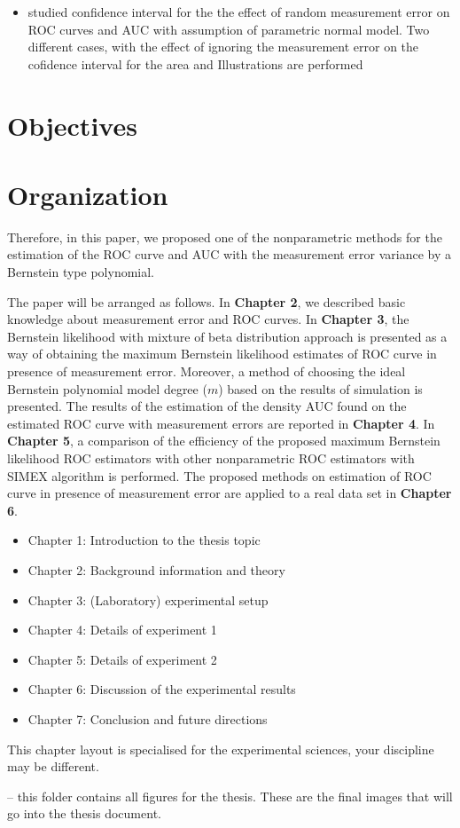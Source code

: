 \begin{itemize}
  \item \cite{faraggi2000effect} studied confidence interval for the the effect of random measurement error on ROC curves and AUC with assumption of parametric normal model. Two different cases, with the effect of ignoring the measurement error on the cofidence interval for the area and  Illustrations are performed
\end{itemize}



\section{Objectives}

\section{Organization}

Therefore, in this paper, we proposed one of the nonparametric methods for the estimation of the ROC curve and AUC with the measurement error variance by a Bernstein type polynomial.

The paper will be arranged as follows. In \textbf{Chapter 2}, we described basic knowledge about measurement error and ROC curves. In \textbf{Chapter 3}, the Bernstein likelihood with mixture of beta distribution approach is presented as a way of obtaining the maximum Bernstein likelihood estimates of ROC curve in presence of measurement error. Moreover, a method of choosing the ideal Bernstein polynomial model degree ($m$) based on the results of simulation is presented. The results of the estimation of the density AUC found on the estimated  ROC curve with measurement errors are reported in \textbf{Chapter 4}. In
\textbf{Chapter 5}, a comparison of the efficiency of the proposed maximum Bernstein likelihood ROC estimators with other nonparametric ROC estimators with SIMEX algorithm is performed. The proposed methods on estimation of ROC curve in presence of measurement error are applied to a real data set in \textbf{Chapter 6}.

\begin{itemize}
\item Chapter 1: Introduction to the thesis topic
\item Chapter 2: Background information and theory
\item Chapter 3: (Laboratory) experimental setup
\item Chapter 4: Details of experiment 1
\item Chapter 5: Details of experiment 2
\item Chapter 6: Discussion of the experimental results
\item Chapter 7: Conclusion and future directions
\end{itemize}
This chapter layout is specialised for the experimental sciences, your discipline may be different.

 -- this folder contains all figures for the thesis. These are the final images that will go into the thesis document.

